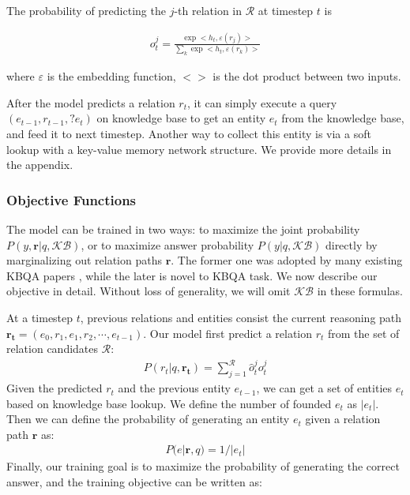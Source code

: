 The probability of predicting the $j$-th relation in $\mathcal{R}$ at timestep $t$ is

\begin{align}
o^j_t = \frac{\exp <h_t,\varepsilon(r_j)>}{\sum_k\exp <h_t,\varepsilon(r_k)>}
\label{eq:r_prob}
\end{align}

where $\varepsilon$ is the embedding  function, $<>$ is the dot product between two inputs. 

After the model predicts a relation $r_t$,  it can simply execute a query $(e_{t-1}, r_{t-1}, ?e_t)$ on knowledge base to get an entity $e_t$ from the knowledge base, and feed it to next timestep. Another way to collect this entity is via a soft lookup with a key-value memory network structure. We provide more details in the appendix.


\subsubsection{Objective Functions}

The model can be trained in two ways: to maximize the joint probability $P(y,\mathbf{r}|q,\mathcal{KB})$, or to maximize answer probability $P(y|q,\mathcal{KB})$ directly by marginalizing out relation paths $\mathbf{r}$. The former one was adopted by many existing KBQA papers \cite{DBLP:conf/coling/ZhouHZ18}, while the later is novel to KBQA task. We now describe our objective in detail. Without loss of generality, we will omit $\mathcal{KB}$ in these formulas.

At a timestep $t$, previous relations and entities consist the current reasoning path $\mathbf{r_t} = (e_{0},r_{1},e_{1},r_{2}, \cdots,e_{t-1})$. Our model first predict a relation $r_t$ from the set of relation candidates $\mathcal{R}$:
\begin{align}
P(r_t|q,\mathbf{r_t}) = \sum_{j=1}^{\mathcal{R}}\hat{o}^j_t{o^j_t}
\end{align}
Given the predicted $r_t$ and the previous entity $e_{t-1}$, we can get a set of entities $e_t$ based on knowledge base lookup. We define the number of founded $e_t$ as $|e_t|$. Then we can define the probability of generating an entity $e_t$ given a relation path $\mathbf{r}$ as: 
\begin{align}
P(e|\mathbf{r},q) = 1/|e_t|
\end{align}
Finally, our training goal is to maximize the probability of generating the correct answer, and the training objective can be written as:

